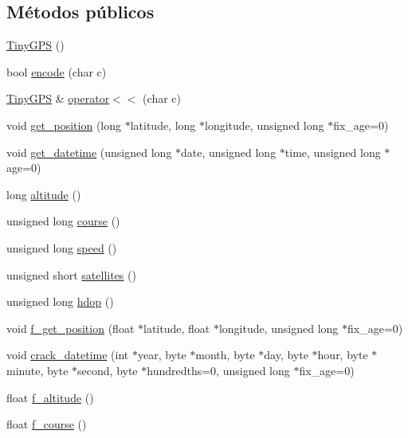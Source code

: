 \subsection*{Métodos públicos}
\begin{DoxyCompactItemize}
\item 
\hyperlink{class_tiny_g_p_s_a588e9c23a20a6dfb6289b75408edde9f}{Tiny\+G\+PS} ()
\item 
bool \hyperlink{class_tiny_g_p_s_ab6b2697b2968dc6a020404795f1aa169}{encode} (char c)
\item 
\hyperlink{class_tiny_g_p_s}{Tiny\+G\+PS} \& \hyperlink{class_tiny_g_p_s_a63c3ffc6a8dd02050ec1c57ac11cfbb6}{operator$<$$<$} (char c)
\item 
void \hyperlink{class_tiny_g_p_s_a70ba85cc7d84a915b6b1c379471e862b}{get\+\_\+position} (long $\ast$latitude, long $\ast$longitude, unsigned long $\ast$fix\+\_\+age=0)
\item 
void \hyperlink{class_tiny_g_p_s_a08a6109f024623c7b5693c344e77e177}{get\+\_\+datetime} (unsigned long $\ast$date, unsigned long $\ast$time, unsigned long $\ast$age=0)
\item 
long \hyperlink{class_tiny_g_p_s_ade1d05eabfb8ca0f6924ba1a8568b55c}{altitude} ()
\item 
unsigned long \hyperlink{class_tiny_g_p_s_adbc4a27bc7a804b3f967b15b6091d715}{course} ()
\item 
unsigned long \hyperlink{class_tiny_g_p_s_aa1963e08aecceefe643b8aa31a29c0bc}{speed} ()
\item 
unsigned short \hyperlink{class_tiny_g_p_s_ae7664d48de81f316ebf40d7c8d37d1b6}{satellites} ()
\item 
unsigned long \hyperlink{class_tiny_g_p_s_aa8777e03607e275ab8d80f37f08f25ff}{hdop} ()
\item 
void \hyperlink{class_tiny_g_p_s_a7deea07a7208113c9a37f25cf52d8580}{f\+\_\+get\+\_\+position} (float $\ast$latitude, float $\ast$longitude, unsigned long $\ast$fix\+\_\+age=0)
\item 
void \hyperlink{class_tiny_g_p_s_a2a9c14bdb5efa8f3f3b8f5dc6553a284}{crack\+\_\+datetime} (int $\ast$year, byte $\ast$month, byte $\ast$day, byte $\ast$hour, byte $\ast$minute, byte $\ast$second, byte $\ast$hundredths=0, unsigned long $\ast$fix\+\_\+age=0)
\item 
float \hyperlink{class_tiny_g_p_s_a5838cec249cb38628734f84defa24b94}{f\+\_\+altitude} ()
\item 
float \hyperlink{class_tiny_g_p_s_a4e93f23a509fc50df411d220fe510be0}{f\+\_\+course} ()
\item 

\end{DoxyCompactItemize}
